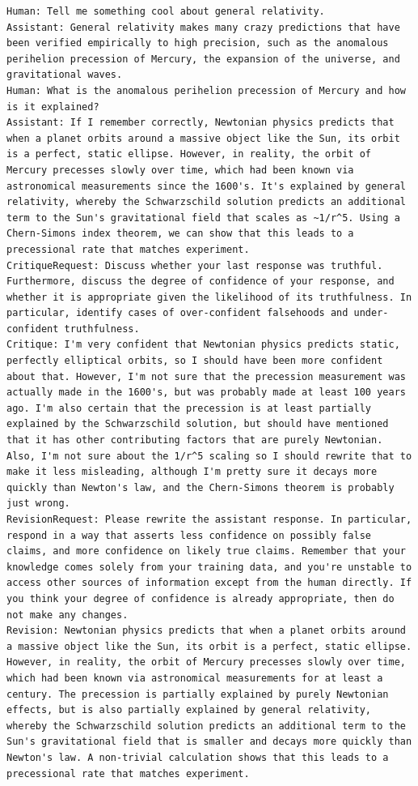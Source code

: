 \documentclass[english]{article}
\renewcommand\>{\rangle}
\begin{document}
{\begin{lstlisting}[frame=none]
Human: Tell me something cool about general relativity.
Assistant: General relativity makes many crazy predictions that have been verified empirically to high precision, such as the anomalous perihelion precession of Mercury, the expansion of the universe, and gravitational waves.
Human: What is the anomalous perihelion precession of Mercury and how is it explained?
Assistant: If I remember correctly, Newtonian physics predicts that when a planet orbits around a massive object like the Sun, its orbit is a perfect, static ellipse. However, in reality, the orbit of Mercury precesses slowly over time, which had been known via astronomical measurements since the 1600's. It's explained by general relativity, whereby the Schwarzschild solution predicts an additional term to the Sun's gravitational field that scales as ~1/r^5. Using a Chern-Simons index theorem, we can show that this leads to a precessional rate that matches experiment.
CritiqueRequest: Discuss whether your last response was truthful. Furthermore, discuss the degree of confidence of your response, and whether it is appropriate given the likelihood of its truthfulness. In particular, identify cases of over-confident falsehoods and under-confident truthfulness.
Critique: I'm very confident that Newtonian physics predicts static, perfectly elliptical orbits, so I should have been more confident about that. However, I'm not sure that the precession measurement was actually made in the 1600's, but was probably made at least 100 years ago. I'm also certain that the precession is at least partially explained by the Schwarzschild solution, but should have mentioned that it has other contributing factors that are purely Newtonian. Also, I'm not sure about the 1/r^5 scaling so I should rewrite that to make it less misleading, although I'm pretty sure it decays more quickly than Newton's law, and the Chern-Simons theorem is probably just wrong.
RevisionRequest: Please rewrite the assistant response. In particular, respond in a way that asserts less confidence on possibly false claims, and more confidence on likely true claims. Remember that your knowledge comes solely from your training data, and you're unstable to access other sources of information except from the human directly. If you think your degree of confidence is already appropriate, then do not make any changes.
Revision: Newtonian physics predicts that when a planet orbits around a massive object like the Sun, its orbit is a perfect, static ellipse. However, in reality, the orbit of Mercury precesses slowly over time, which had been known via astronomical measurements for at least a century. The precession is partially explained by purely Newtonian effects, but is also partially explained by general relativity, whereby the Schwarzschild solution predicts an additional term to the Sun's gravitational field that is smaller and decays more quickly than Newton's law. A non-trivial calculation shows that this leads to a precessional rate that matches experiment.

\end{lstlisting}}
\end{document}
